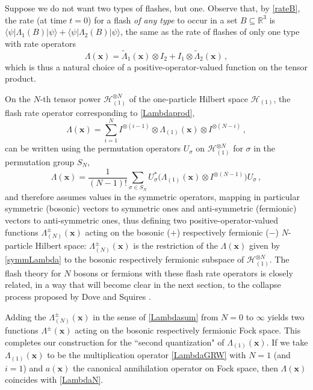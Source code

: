 \documentclass[12pt]{article}
\newcommand{\RRR}{\mathbb{R}}
\newcommand{\Hilbert}{\mathscr{H}}
\newcommand{\vx}{\boldsymbol{x}}
\newcommand{\vr}{\boldsymbol{r}}
\newcommand{\E}{\mathrm{e}} %
\newcommand{\1}{1}
\newcommand{\nconst}{\mathcal{N}}
\newcommand{\z}[1]{{#1}}
\begin{document}
Suppose we do not want two types of flashes, but one. Observe that, \z{by \eqref{rateB}, the rate (at time $t=0$) for a flash \emph{of any type} to occur in a set $B\subseteq \RRR^3$ is $\langle \psi |\Lambda_1(B)|\psi \rangle + \langle \psi |\Lambda_2(B)|\psi \rangle$, the same as the rate of flashes of only one type with rate operators}
\begin{equation}\label{Lambdaprod}
  \Lambda(\vx) = \tilde\Lambda_{1}(\vx) \otimes I_{2} + 
  I_{1} \otimes \tilde\Lambda_{2}(\vx) \,,
\end{equation}
which is thus a natural choice of a positive-operator-valued function on the tensor product.

On the $N$-th tensor power $\Hilbert_{(1)}^{\otimes N}$ \z{of the one-particle Hilbert space $\Hilbert_{(1)}$}, the \z{flash rate operator corresponding to \eqref{Lambdaprod},}
\begin{equation}
  \Lambda(\vx) = \sum_{i=1}^N I^{\otimes (i-1)} \otimes \Lambda_{(1)}(\vx) 
  \otimes I^{\otimes (N-i)}\,,
\end{equation}
can be written using the permutation operators $U_\sigma$ on $\Hilbert_{(1)}^{\otimes N}$ for $\sigma$ in the permutation group $S_N$,
\begin{equation}\label{symmLambda}
  \Lambda(\vx) = \frac{1}{(N-1)!} \sum_{\sigma \in S_N} U_\sigma^* 
  \bigl( \Lambda_{(1)}(\vx) 
  \otimes I^{\otimes (N-1)} \bigr) U_\sigma \,,
\end{equation}
and therefore assumes values in the symmetric operators, mapping in particular  symmetric (bosonic) vectors to symmetric ones and anti-symmetric (fermionic) vectors to anti-symmetric ones, thus defining two positive-operator-valued functions $\Lambda_{(N)}^{\pm}(\vx)$ acting on the bosonic ($+$) respectively fermionic ($-$) $N$-particle Hilbert space: \z{$\Lambda_{(N)}^{\pm}(\vx)$ is the restriction of the $\Lambda(\vx)$ given by \eqref{symmLambda} to the bosonic respectively fermionic subspace of $\Hilbert_{(1)}^{\otimes N}$. The flash theory for $N$ bosons or fermions with these flash rate operators is closely related, in a way that will become clear in the next section, to the collapse process proposed by Dove and Squires \cite{dovethesis,DS95}.}

\z{Adding the} $\Lambda^\pm_{(N)}(\vx)$ in the sense of \eqref{Lambdasum} from $N=0$ to $\infty$ yields two functions $\Lambda^{\pm}(\vx)$ acting on the bosonic respectively fermionic Fock space. This completes our construction for the ``second quantization" of $\Lambda_{(1)}(\vx)$. If we take $\Lambda_{(1)}(\vx)$ to be the multiplication operator 
\eqref{LambdaGRW} with $N=1$ (and $i=1$) and $a(\vx)$ the canonical annihilation operator on Fock space, then $\Lambda(\vx)$ coincides with \eqref{LambdaN}.
\end{document}

